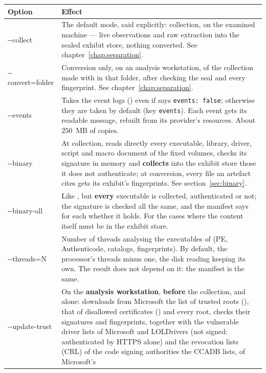 \documentclass[11pt,a4paper,oneside]{report}
\begin{document}
\begin{longtable}{@{}>{\ttfamily}L{3.2cm}L{11.2cm}@{}}
\toprule
\normalfont\bfseries Option & \bfseries Effect \\
\midrule
\endhead
-{}-collect & The default mode, said explicitly: collection, on the examined
  machine — live observations and raw extraction into the sealed exhibit store,
  nothing converted. See chapter~\ref{chap:separation}. \\
-{}-convert=folder & Conversion only, on an analysis workstation, of the
  collection made with  in that folder, after checking the seal
  and every fingerprint. See chapter~\ref{chap:separation}. \\
-{}-events & Takes the event logs () even if 
  says \texttt{events: false}; otherwise they are taken by default (key
  \texttt{events}). Each event gets its readable message, rebuilt from its
  provider's resources. About 250~MB of copies. \\
-{}-binary & At collection, reads directly every executable, library, driver,
  script and macro document of the fixed volumes, checks its signature in memory
  and \textbf{collects} into the exhibit store those it does not authenticate;
  at conversion, every file an artefact cites gets its exhibit's fingerprints.
  See section~\ref{sec:binary}. \\
-{}-binary-all & Like , but \textbf{every} executable is collected,
  authenticated or not; the signature is checked all the same, and the manifest
  says for each whether it holds. For the cases where the content itself must
  be in the exhibit store. \\
-{}-threads=N & Number of threads analysing the executables of 
   (PE, Authenticode, catalogs, fingerprints). By default, the
  processor's threads minus one, the disk reading keeping its own. The result
  does not depend on it: the manifest is the same. \\
-{}-update-trust\newline [=folder] & On the \textbf{analysis workstation}, \textbf{before} the
  collection, and alone: downloads from Microsoft the list of trusted roots
  (), that of disallowed certificates
  () and every root, checks their signatures and
  fingerprints, together with the vulnerable driver lists of Microsoft and
  LOLDrivers (not signed: authenticated by HTTPS alone) and the revocation
  lists (CRL) of the code signing authorities the CCADB lists, of Microsoft's

\end{longtable}
\end{document}
